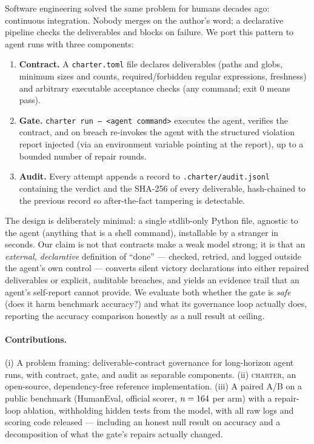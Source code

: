 \documentclass{article}
\begin{document}
Software engineering solved the same problem for humans decades ago: continuous
integration. Nobody merges on the author's word; a declarative pipeline checks the
deliverables and blocks on failure. We port this pattern to agent runs with three
components:

\begin{enumerate}
\item \textbf{Contract.} A \texttt{charter.toml} file declares deliverables (paths and
globs, minimum sizes and counts, required/forbidden regular expressions, freshness)
and arbitrary executable acceptance checks (any command; exit 0 means pass).
\item \textbf{Gate.} \texttt{charter run -- <agent command>} executes the agent,
verifies the contract, and on breach re-invokes the agent with the structured
violation report injected (via an environment variable pointing at the report), up to
a bounded number of repair rounds.
\item \textbf{Audit.} Every attempt appends a record to \texttt{.charter/audit.jsonl}
containing the verdict and the SHA-256 of every deliverable, hash-chained to the
previous record so after-the-fact tampering is detectable.
\end{enumerate}

The design is deliberately minimal: a single stdlib-only Python file, agnostic to the
agent (anything that is a shell command), installable by a stranger in seconds. Our
claim is not that contracts make a weak model strong; it is that an \emph{external,
declarative} definition of ``done'' --- checked, retried, and logged outside the
agent's own control --- converts silent victory declarations into either repaired
deliverables or explicit, auditable breaches, and yields an evidence trail that an
agent's self-report cannot provide. We evaluate both whether the gate is \emph{safe}
(does it harm benchmark accuracy?) and what its governance loop actually does,
reporting the accuracy comparison honestly as a null result at ceiling.

\paragraph{Contributions.}
(i) A problem framing: deliverable-contract governance for long-horizon agent runs,
with contract, gate, and audit as separable components.
(ii) \textsc{charter}, an open-source, dependency-free reference implementation.
(iii) A paired A/B on a public benchmark (HumanEval, official scorer, $n=164$
per arm) with a repair-loop ablation, withholding hidden tests from the model, with
all raw logs and scoring code released --- including an honest null result on
accuracy and a decomposition of what the gate's repairs actually changed.
\end{document}

